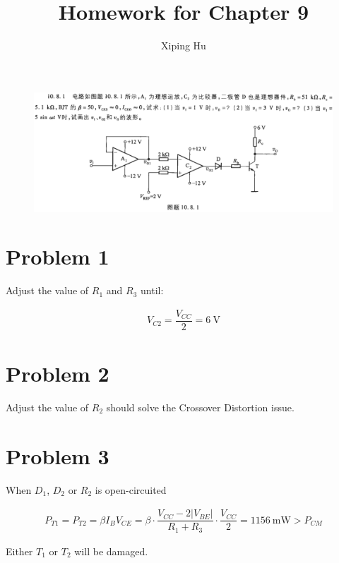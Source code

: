 \documentclass{article}
\author{Xiping Hu}
\affil{https://hxp.plus/}
\title{Homework for Chapter 9}
\newcommand{\si}[1]{\  \mathrm{#1}}
\begin{document}
\maketitle

\begin{figure}[H]
  \centering
  \includegraphics[width=\linewidth]{figures/Problem1081}
\end{figure}

\section{Problem 1}

Adjust the value of $R_1$ and $R_3$ until: 

\begin{equation*}
  \begin{aligned}
    V_{C2} = \dfrac{V_{CC}}{2} = 6 \si{V} 
  \end{aligned}
\end{equation*}

\section{Problem 2}

Adjust the value of $R_2$ should solve the Crossover Distortion issue.

\section{Problem 3}

When $D_1$, $D_2$ or $R_2$ is open-circuited

\begin{equation*}
  \begin{aligned}
    P_{T1} = P_{T2} = \beta I_B V_{CE} = \beta \cdot \dfrac{V_{CC} - 2 |V_{BE}|}{R_1 + R_3} \cdot \dfrac{V_{CC}}{2} = 1156 \si{mW} > P_{CM}  
  \end{aligned}
\end{equation*}

Either $T_1$ or $T_2$ will be damaged.
\end{document}
